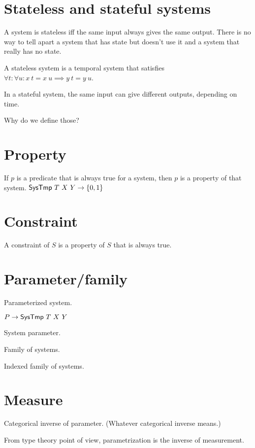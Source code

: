 \section{Stateless and stateful systems}

A system is stateless iff the same input always gives the same output.
There is no way to tell apart a system that has state
but doesn't use it and a system that really has no state.

\begin{m:def}
    A stateless system is a temporal system that satisfies \(\forall t : \forall u: x~t = x~u \implies y~t = y~u\).
\end{m:def}

In a stateful system, the same input can give different outputs, depending on time.

Why do we define those?

\section{Property}

If \(p\) is a predicate that is always true for a system,
then \(p\) is a property of that system.
\( \textsf{SysTmp}~T~X~Y \to \{0,1\} \)

\section{Constraint}

A constraint of \(S\) is a property of \(S\) that is always true.

\section{Parameter/family}

Parameterized system.

\( P \to \textsf{SysTmp}~T~X~Y \)

System parameter.

Family of systems.

Indexed family of systems.

\section{Measure}

Categorical inverse of parameter. (Whatever categorical inverse means.)

From type theory point of view, parametrization is the inverse of measurement.

